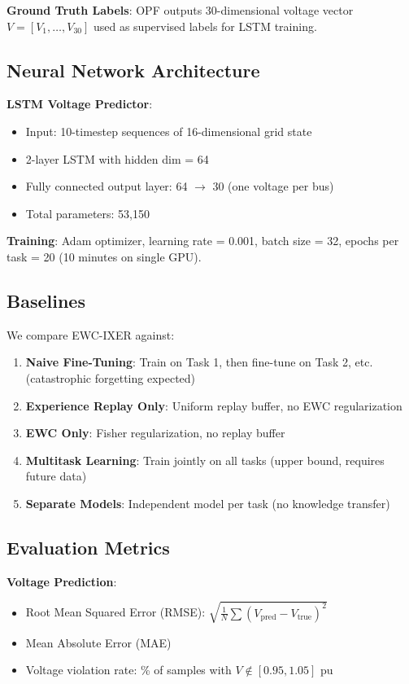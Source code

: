 \documentclass[journal]{IEEEtran}
\begin{document}
\textbf{Ground Truth Labels}: OPF outputs 30-dimensional voltage vector $V = [V_1, \ldots, V_{30}]$ used as supervised labels for LSTM training.

\subsection{Neural Network Architecture}

\textbf{LSTM Voltage Predictor}:
\begin{itemize}
    \item Input: 10-timestep sequences of 16-dimensional grid state
    \item 2-layer LSTM with hidden dim = 64
    \item Fully connected output layer: 64 $\to$ 30 (one voltage per bus)
    \item Total parameters: 53,150
\end{itemize}

\textbf{Training}: Adam optimizer, learning rate = 0.001, batch size = 32, epochs per task = 20 (10 minutes on single GPU).

\subsection{Baselines}

We compare EWC-IXER against:

\begin{enumerate}
    \item \textbf{Naive Fine-Tuning}: Train on Task 1, then fine-tune on Task 2, etc. (catastrophic forgetting expected)
    \item \textbf{Experience Replay Only}: Uniform replay buffer, no EWC regularization
    \item \textbf{EWC Only}: Fisher regularization, no replay buffer
    \item \textbf{Multitask Learning}: Train jointly on all tasks (upper bound, requires future data)
    \item \textbf{Separate Models}: Independent model per task (no knowledge transfer)
\end{enumerate}

\subsection{Evaluation Metrics}

\textbf{Voltage Prediction}:
\begin{itemize}
    \item Root Mean Squared Error (RMSE): $\sqrt{\frac{1}{N} \sum (V_{\text{pred}} - V_{\text{true}})^2}$
    \item Mean Absolute Error (MAE)
    \item Voltage violation rate: \% of samples with $V \notin [0.95, 1.05]$ pu
\end{itemize}
\end{document}
